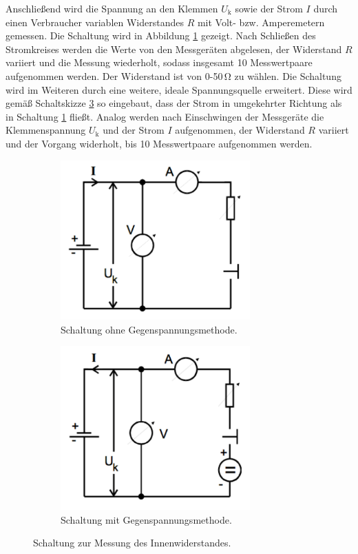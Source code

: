 Anschließend wird die Spannung an den Klemmen $U_\text{k}$ sowie der Strom $I$ durch einen Verbraucher variablen Widerstandes $R$ mit Volt- bzw. Amperemetern gemessen.
Die Schaltung wird in Abbildung \ref{fig:ri} gezeigt.
Nach Schließen des Stromkreises werden die Werte von den Messgeräten abgelesen, der Widerstand $R$ variiert und die Messung wiederholt, sodass insgesamt 10 Messwertpaare aufgenommen werden.
Der Widerstand ist von 0-50\,\si{\ohm} zu wählen.
Die Schaltung wird im Weiteren durch eine weitere, ideale Spannungsquelle erweitert.
Diese wird gemäß Schaltskizze \ref{fig:rimgu} so eingebaut, dass der Strom in umgekehrter Richtung als in Schaltung \ref{fig:ri} fließt.
Analog werden nach Einschwingen der Messgeräte die Klemmenspannung $U_\text{k}$ und der Strom $I$ aufgenommen, der Widerstand $R$ variiert und der Vorgang widerholt, bis 10 Messwertpaare aufgenommen werden.
\begin{figure}
	\begin{subfigure}{0.5\textwidth}
	\centering
	\includegraphics[width=0.8\textwidth]{Bilder/Messung1.pdf}
	\caption{Schaltung ohne Gegenspannungsmethode.}
	\label{fig:ri}
	\end{subfigure}
	\begin{subfigure}{0.5\textwidth}
	\centering
	\includegraphics[width=0.8\textwidth]{Bilder/Messung2.pdf}
	\caption{Schaltung mit Gegenspannungsmethode.}
	\label{fig:rimgu}
	\end{subfigure}
	\caption{Schaltung zur Messung des Innenwiderstandes.}
\end{figure}

